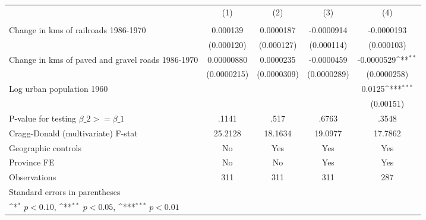 {
\def\sym#1{\ifmmode^{#1}\else\(^{#1}\)\fi}
\begin{tabular}{l*{4}{c}}
\hline\hline
                &\multicolumn{1}{c}{(1)}&\multicolumn{1}{c}{(2)}&\multicolumn{1}{c}{(3)}&\multicolumn{1}{c}{(4)}\\
                &\multicolumn{1}{c}{}&\multicolumn{1}{c}{}&\multicolumn{1}{c}{}&\multicolumn{1}{c}{}\\
\hline
Change in kms of railroads 1986-1970& 0.000139         &0.0000187         &-0.0000914         &-0.0000193         \\
                &(0.000120)         &(0.000127)         &(0.000114)         &(0.000103)         \\
[1em]
Change in kms of paved and gravel roads 1986-1970&0.00000880         &0.0000235         &-0.0000459         &-0.0000529\sym{**} \\
                &(0.0000215)         &(0.0000309)         &(0.0000289)         &(0.0000258)         \\
[1em]
Log urban population 1960&                  &                  &                  &   0.0125\sym{***}\\
                &                  &                  &                  &(0.00151)         \\
\hline
P-value for testing $\beta\_{2} >= \beta\_{1}$&    .1141         &     .517         &    .6763         &    .3548         \\
Cragg-Donald (multivariate) F-stat&  25.2128         &  18.1634         &  19.0977         &  17.7862         \\
Geographic controls&       No         &      Yes         &      Yes         &      Yes         \\
Province FE     &       No         &       No         &      Yes         &      Yes         \\
Observations    &      311         &      311         &      311         &      287         \\
\hline\hline
\multicolumn{5}{l}{\footnotesize Standard errors in parentheses}\\
\multicolumn{5}{l}{\footnotesize \sym{*} \(p<0.10\), \sym{**} \(p<0.05\), \sym{***} \(p<0.01\)}\\
\end{tabular}
}
